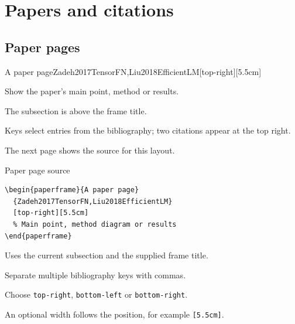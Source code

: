\section{Papers and citations}
\sectiontocpage
{}
\subsection{Paper pages}

\begin{paperframe}{A paper page}{Zadeh2017TensorFN,Liu2018EfficientLM}[top-right][5.5cm]
  \begin{description}[Citations]
    \item[Body] Show the paper's main point, method or results.
    \item[Header] The subsection is above the frame title.
    \item[Citations] Keys select entries from the bibliography; two citations appear at the top right.
  \end{description}
  \medskip
  The next page shows the source for this layout.
\end{paperframe}

\begin{frame}[fragile]{Paper page source}
  \begin{verbatim}
\begin{paperframe}{A paper page}
  {Zadeh2017TensorFN,Liu2018EfficientLM}
  [top-right][5.5cm]
  % Main point, method diagram or results
\end{paperframe}
  \end{verbatim}
  \begin{description}[Position]
    \item[Header] Uses the current subsection and the supplied frame title.
    \item[Keys] Separate multiple bibliography keys with commas.
    \item[Position] Choose \texttt{top-right}, \texttt{bottom-left} or \texttt{bottom-right}.
    \item[Width] An optional width follows the position, for example \texttt{[5.5cm]}.
  \end{description}
\end{frame}


